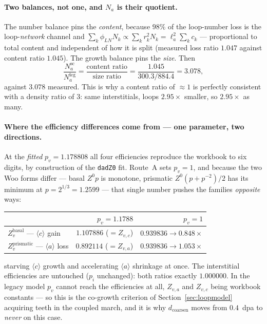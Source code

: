 \documentclass[11pt]{article}
\newcommand{\aloop}{\ensuremath{\langle a\rangle}}
\newcommand{\cloop}{\ensuremath{\langle c\rangle}}
\newcommand{\code}[1]{\texttt{\small #1}}
\begin{document}
\paragraph{Two balances, not one, and $N_a$ is their quotient.} The number
balance pins the \emph{content}, because $98\%$ of the loop-number loss is the
loop-\emph{network} channel and $\sum_k \phi_{LN} N_k \propto \sum_k r_k^2 N_k
= \ell_a^2 \sum_k c_k$ --- proportional to total content and independent of how
it is split (measured loss ratio $1.047$ against content ratio $1.045$). The
growth balance pins the \emph{size}. Then
%
\begin{equation}
\label{eq:na-quotient}
  \frac{N_a^{\text{sc}}}{N_a^{\text{leg}}}
  = \frac{\text{content ratio}}{\text{size ratio}}
  = \frac{1.045}{300.3/884.4} = 3.078,
\end{equation}
%
against $3.078$ measured. This is why a content ratio of $\approx 1$ is
perfectly consistent with a density ratio of $3$: same interstitials, loops
$2.95\times$ smaller, so $2.95\times$ as many.

\paragraph{Where the efficiency differences come from --- one parameter, two
directions.} At the \emph{fitted} $p_v = 1.178808$ all four efficiencies
reproduce the workbook to six digits, by construction of the \code{dadZ0} fit.
Route~A sets $p_v = 1$, and because the two Woo forms differ --- basal
$Z^0 p$ is monotone, prismatic $Z^0(p+p^{-2})/2$ has its minimum at
$p = 2^{1/3} = 1.2599$ --- that single number pushes the families
\emph{opposite} ways:

\begin{center}
\begin{tabular}{@{}lrr@{}}
\toprule
 & $p_v = 1.1788$ & $p_v = 1$ \\
\midrule
$Z^{\text{basal}}_{v}$ --- \cloop{} gain     & $1.107886$ ($= Z_{v,c}$) & $0.939836 \to \mathbf{0.848\times}$ \\
$Z^{\text{prismatic}}_{v}$ --- \aloop{} loss & $0.892114$ ($= Z_{v,a}$) & $0.939836 \to \mathbf{1.053\times}$ \\
\bottomrule
\end{tabular}
\end{center}

starving \cloop{} growth and accelerating \aloop{} shrinkage at once. The
interstitial efficiencies are untouched ($p_i$ unchanged): both ratios exactly
$1.000000$. In the legacy model $p_v$ cannot reach the efficiencies at all,
$Z_{v,a}$ and $Z_{v,c}$ being workbook constants --- so this is the co-growth
criterion of Section~\ref{sec:loopmodel} acquiring teeth in the coupled march,
and it is why $d_{\text{coarsen}}$ moves from $0.4$~\textrm{dpa} to \emph{never}
on this case.
\end{document}
